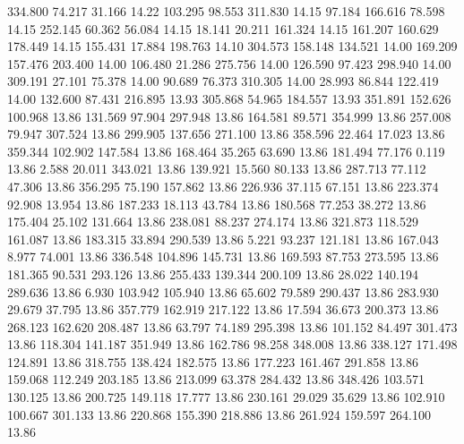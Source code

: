  334.800   74.217   31.166        14.22
 103.295   98.553  311.830        14.15
  97.184  166.616   78.598        14.15
 252.145   60.362   56.084        14.15
  18.141   20.211  161.324        14.15
 161.207  160.629  178.449        14.15
 155.431   17.884  198.763        14.10
 304.573  158.148  134.521        14.00
 169.209  157.476  203.400        14.00
 106.480   21.286  275.756        14.00
 126.590   97.423  298.940        14.00
 309.191   27.101   75.378        14.00
  90.689   76.373  310.305        14.00
  28.993   86.844  122.419        14.00
 132.600   87.431  216.895        13.93
 305.868   54.965  184.557        13.93
 351.891  152.626  100.968        13.86
 131.569   97.904  297.948        13.86
 164.581   89.571  354.999        13.86
 257.008   79.947  307.524        13.86
 299.905  137.656  271.100        13.86
 358.596   22.464   17.023        13.86
 359.344  102.902  147.584        13.86
 168.464   35.265   63.690        13.86
 181.494   77.176    0.119        13.86
   2.588   20.011  343.021        13.86
 139.921   15.560   80.133        13.86
 287.713   77.112   47.306        13.86
 356.295   75.190  157.862        13.86
 226.936   37.115   67.151        13.86
 223.374   92.908   13.954        13.86
 187.233   18.113   43.784        13.86
 180.568   77.253   38.272        13.86
 175.404   25.102  131.664        13.86
 238.081   88.237  274.174        13.86
 321.873  118.529  161.087        13.86
 183.315   33.894  290.539        13.86
   5.221   93.237  121.181        13.86
 167.043    8.977   74.001        13.86
 336.548  104.896  145.731        13.86
 169.593   87.753  273.595        13.86
 181.365   90.531  293.126        13.86
 255.433  139.344  200.109        13.86
  28.022  140.194  289.636        13.86
   6.930  103.942  105.940        13.86
  65.602   79.589  290.437        13.86
 283.930   29.679   37.795        13.86
 357.779  162.919  217.122        13.86
  17.594   36.673  200.373        13.86
 268.123  162.620  208.487        13.86
  63.797   74.189  295.398        13.86
 101.152   84.497  301.473        13.86
 118.304  141.187  351.949        13.86
 162.786   98.258  348.008        13.86
 338.127  171.498  124.891        13.86
 318.755  138.424  182.575        13.86
 177.223  161.467  291.858        13.86
 159.068  112.249  203.185        13.86
 213.099   63.378  284.432        13.86
 348.426  103.571  130.125        13.86
 200.725  149.118   17.777        13.86
 230.161   29.029   35.629        13.86
 102.910  100.667  301.133        13.86
 220.868  155.390  218.886        13.86
 261.924  159.597  264.100        13.86
